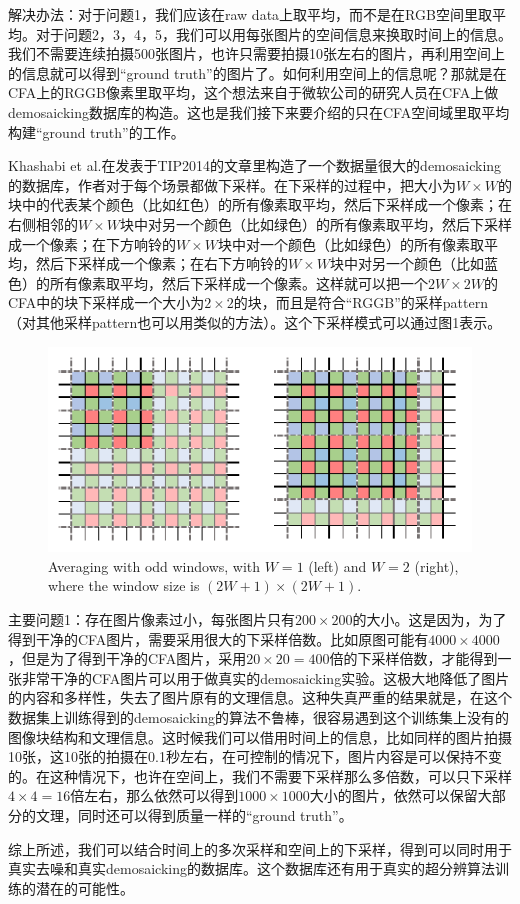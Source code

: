 \documentclass[10pt,twocolumn,letterpaper]{article}
\begin{document}
解决办法：对于问题1，我们应该在raw data上取平均，而不是在RGB空间里取平均。对于问题2，3，4，5，我们可以用每张图片的空间信息来换取时间上的信息。我们不需要连续拍摄500张图片，也许只需要拍摄10张左右的图片，再利用空间上的信息就可以得到``ground truth''的图片了。如何利用空间上的信息呢？那就是在CFA上的RGGB像素里取平均，这个想法来自于微软公司的研究人员在CFA上做demosaicking数据库的构造\cite{khashabi2014joint}。这也是我们接下来要介绍的只在CFA空间域里取平均构建``ground truth''的工作。


Khashabi et al.在发表于TIP2014的文章\cite{khashabi2014joint}里构造了一个数据量很大的demosaicking的数据库，作者对于每个场景都做下采样。在下采样的过程中，把大小为$W\times W$的块中的代表某个颜色（比如红色）的所有像素取平均，然后下采样成一个像素；在右侧相邻的$W\times W$块中对另一个颜色（比如绿色）的所有像素取平均，然后下采样成一个像素；在下方响铃的$W\times W$块中对一个颜色（比如绿色）的所有像素取平均，然后下采样成一个像素；在右下方响铃的$W\times W$块中对另一个颜色（比如蓝色）的所有像素取平均，然后下采样成一个像素。这样就可以把一个$2W\times2W$的CFA中的块下采样成一个大小为$2\times2$的块，而且是符合``RGGB''的采样pattern（对其他采样pattern也可以用类似的方法）。这个下采样模式可以通过图1表示。

\begin{figure}
\centering
\includegraphics[width=0.95\linewidth]{CFA.png}
\caption{Averaging with odd windows, with $W = 1$ (left) and $W = 2$ (right),
where the window size is $(2W + 1)\times (2W + 1)$.
}
\label{fig1}
\end{figure}


主要问题1：存在图片像素过小，每张图片只有$200\times200$的大小。这是因为，为了得到干净的CFA图片，需要采用很大的下采样倍数。比如原图可能有$4000\times4000$，但是为了得到干净的CFA图片，采用$20\times20=400$倍的下采样倍数，才能得到一张非常干净的CFA图片可以用于做真实的demosaicking实验。这极大地降低了图片的内容和多样性，失去了图片原有的文理信息。这种失真严重的结果就是，在这个数据集上训练得到的demosaicking的算法不鲁棒，很容易遇到这个训练集上没有的图像块结构和文理信息。这时候我们可以借用时间上的信息，比如同样的图片拍摄10张，这10张的拍摄在0.1秒左右，在可控制的情况下，图片内容是可以保持不变的。在这种情况下，也许在空间上，我们不需要下采样那么多倍数，可以只下采样$4\times4=16$倍左右，那么依然可以得到$1000\times1000$大小的图片，依然可以保留大部分的文理，同时还可以得到质量一样的``ground truth''。

综上所述，我们可以结合时间上的多次采样和空间上的下采样，得到可以同时用于真实去噪和真实demosaicking的数据库。这个数据库还有用于真实的超分辨算法训练的潜在的可能性。



{
\small


}
\end{document}
